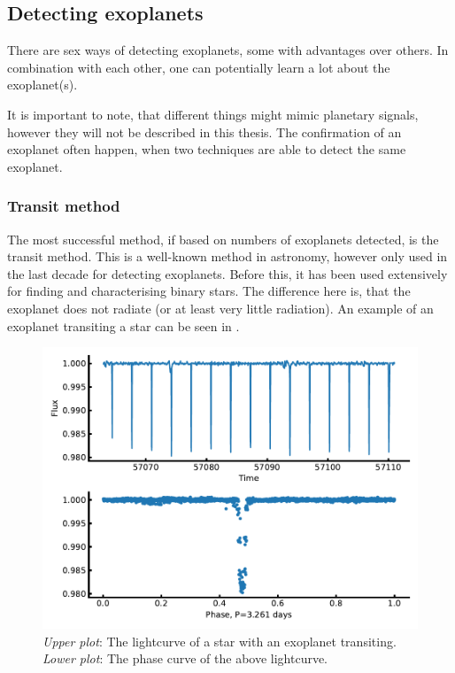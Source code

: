 \subsection{Detecting exoplanets}
\label{sec:detecting_exoplanets}

There are sex ways of detecting exoplanets, some with advantages over others. In combination with
each other, one can potentially learn a lot about the exoplanet(s).

It is important to note, that different things might mimic planetary signals, however they will not
be described in this thesis. The confirmation of an exoplanet often happen, when two techniques are
able to detect the same exoplanet.



\subsubsection{Transit method}

The most successful method, if based on numbers of exoplanets detected, is the transit method. This
is a well-known method in astronomy, however only used in the last decade for detecting exoplanets.
Before this, it has been used extensively for finding and characterising binary stars. The
difference here is, that the exoplanet does not radiate (or at least very little radiation). An
example of an exoplanet transiting a star can be seen in .

\begin{figure}[htpb!]
    \centering
    \includegraphics[width=1.0\linewidth]{figures/transitMethod.pdf}
    \caption{\emph{Upper plot}: The lightcurve of a star with an exoplanet transiting.
             \emph{Lower plot}: The phase curve of the above lightcurve.}
    \label{fig:transitMethod}
\end{figure}

